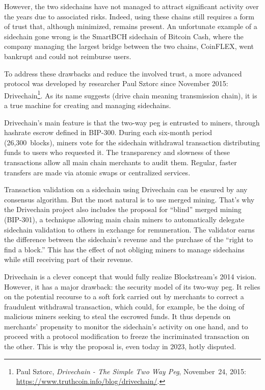 \documentclass[
  a5paper,
  smalldemyvopaper,10pt,twoside,onecolumn,openright,extrafontsizes,hidelinks]{memoir}
\begin{document}
However, the two sidechains have not managed to attract significant
activity over the years due to associated risks. Indeed, using these
chains still requires a form of trust that, although minimized, remains
present. An unfortunate example of a sidechain gone wrong is the
SmartBCH sidechain of Bitcoin Cash, where the company managing the
largest bridge between the two chains, CoinFLEX, went bankrupt and could
not reimburse users.

To address these drawbacks and reduce the involved trust, a more
advanced protocol was developed by researcher Paul Sztorc since November
2015: Drivechain\footnote{Paul Sztorc, \emph{Drivechain - The Simple Two
  Way Peg}, November~24, 2015:
  \url{https://www.truthcoin.info/blog/drivechain/}.}. As its name
suggests (drive chain meaning transmission chain), it is a true machine
for creating and managing sidechains.

Drivechain's main feature is that the two-way peg is entrusted to
miners, through hashrate escrow defined in BIP-300. During each
six-month period (26,300~blocks), miners vote for the sidechain
withdrawal transaction distributing funds to users who requested it. The
transparency and slowness of these transactions allow all main chain
merchants to audit them. Regular, faster transfers are made via atomic
swaps or centralized services.

Transaction validation on a sidechain using Drivechain can be ensured by
any consensus algorithm. But the most natural is to use merged mining.
That's why the Drivechain project also includes the proposal for
``blind'' merged mining (BIP-301), a technique allowing main chain
miners to automatically delegate sidechain validation to others in
exchange for remuneration. The validator earns the difference between
the sidechain's revenue and the purchase of the ``right to find a
block.'' This has the effect of not obliging miners to manage sidechains
while still receiving part of their revenue.

Drivechain is a clever concept that would fully realize Blockstream's
2014 vision. However, it has a major drawback: the security model of its
two-way peg. It relies on the potential recourse to a soft fork carried
out by merchants to correct a fraudulent withdrawal transaction, which
could, for example, be the doing of malicious miners seeking to steal
the escrowed funds. It thus depends on merchants' propensity to monitor
the sidechain's activity on one hand, and to proceed with a protocol
modification to freeze the incriminated transaction on the other. This
is why the proposal is, even today in 2023, hotly disputed.
\end{document}
